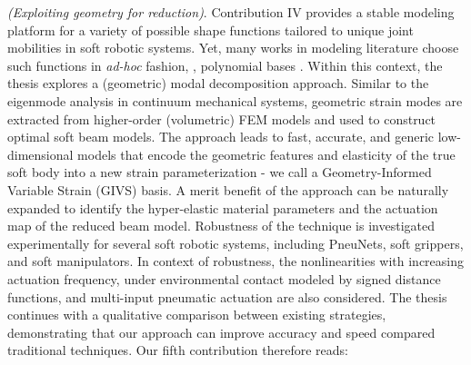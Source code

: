 \textit{(Exploiting geometry for reduction)}. Contribution IV provides a stable modeling platform for a variety of possible shape functions tailored to unique joint mobilities in soft robotic systems. Yet, many works in modeling literature choose such functions in \textit{ad-hoc} fashion, \eg, polynomial bases \cite{DellaSantina2020,Boyer2021,Chirikjian1991}. Within this context, the thesis explores a (geometric) modal decomposition approach. Similar to the eigenmode analysis in continuum mechanical systems, geometric strain modes are extracted from higher-order (volumetric) FEM models and used to construct optimal soft beam models. The approach leads to fast, accurate, and generic low-dimensional models that encode the geometric features and elasticity of the true soft body into a new strain parameterization - we call a Geometry-Informed Variable Strain (GIVS) basis. A merit benefit of the approach can be naturally expanded to identify the hyper-elastic material parameters and the actuation map of the reduced beam model. Robustness of the technique is investigated experimentally for several soft robotic systems, including PneuNets, soft grippers, and soft manipulators. In context of robustness, the nonlinearities with increasing actuation frequency, under environmental contact modeled by signed distance functions, and multi-input pneumatic actuation are also considered. The thesis continues with a qualitative comparison between existing strategies, demonstrating that our approach can improve accuracy and speed compared traditional techniques. Our fifth contribution therefore reads:
 


